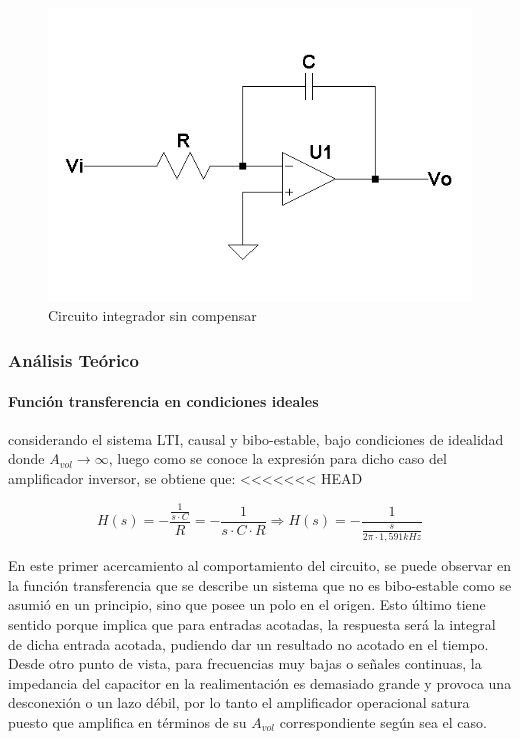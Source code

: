 \begin{figure}[H]
	\centering
	\includegraphics[scale=0.8]{Recursos/Integrador/Circuito_integrador.png}
	\caption{Circuito integrador sin compensar}
	\label{fig:circuito_integrador}
\end{figure}
\subsubsection{An\'alisis Te\'orico}

\paragraph*{Funci\'on transferencia en condiciones ideales} considerando el sistema LTI, causal y bibo-estable, bajo condiciones de idealidad donde $A_{vol} \rightarrow \infty$, luego como se conoce la expresi\'on para dicho caso del amplificador inversor, se obtiene que:
<<<<<<< HEAD

\begin{equation}
	H(s) = - \frac{\frac{1}{s \cdot C}}{R} = - \frac{1}{s \cdot C \cdot R}
	\Rightarrow
	H(s) = - \frac{1}{\frac{s}{2 \pi \cdot 1,591kHz}}
	\label{eq:integrador_transfer_ideal}
\end{equation}

En este primer acercamiento al comportamiento del circuito, se puede observar en la funci\'on transferencia que se describe un sistema que no es bibo-estable como se asumi\'o en un principio, sino que posee un polo en el origen. Esto \'ultimo tiene sentido porque implica que para entradas acotadas, la respuesta ser\'a la integral de dicha entrada acotada, pudiendo dar un resultado no acotado en el tiempo. Desde otro punto de vista, para frecuencias muy bajas o se\~nales continuas, la impedancia del capacitor en la realimentaci\'on es demasiado grande y provoca una desconexi\'on o un lazo d\'ebil, por lo tanto el amplificador operacional satura puesto que amplifica en t\'erminos de su $A_{vol}$ correspondiente seg\'un sea el caso.

